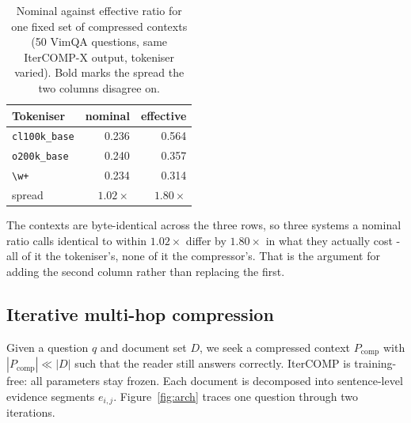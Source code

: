 \documentclass{llncs}
\begin{document}
\begin{table}[htbp]
\centering
\caption{Nominal against effective ratio for one fixed set of compressed
contexts (50 VimQA questions, same IterCOMP-X output, tokeniser varied). Bold
marks the spread the two columns disagree on.}
\label{tab:effspread}
\small
\begin{tabular}{lrr}
\toprule
Tokeniser & nominal & effective \\
\midrule
\texttt{cl100k\_base} & 0.236 & 0.564 \\
\texttt{o200k\_base} & 0.240 & 0.357 \\
\texttt{\textbackslash w+} & 0.234 & 0.314 \\
\midrule
spread & $1.02\times$ & $\mathbf{1.80\times}$ \\
\bottomrule
\end{tabular}
\end{table}

The contexts are byte-identical across the three rows, so three systems a nominal
ratio calls identical to within $1.02\times$ differ by $1.80\times$ in what they
actually cost - all of it the tokeniser's, none of it the compressor's. That is
the argument for adding the second column rather than replacing the first.


\subsection{Iterative multi-hop compression}
\label{sec:method}


Given a question $q$ and document set $D$, we seek a compressed context
$P_{\text{comp}}$ with $|P_{\text{comp}}| \ll |D|$ such that the reader still
answers correctly. IterCOMP is training-free: all parameters stay frozen.
Each document is decomposed into sentence-level evidence segments $e_{i,j}$.
Figure~\ref{fig:arch} traces one question through two iterations.
\end{document}
